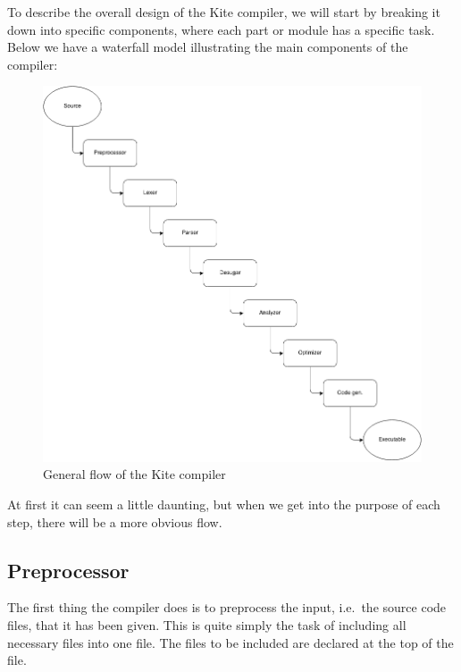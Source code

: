 
To describe the overall design of the Kite compiler, we will start by breaking it down into specific components, where each part or module has a specific task. Below we have a waterfall model illustrating the main components of the compiler:

\begin{figure}[H]
  \centering
  \includegraphics[scale=0.45]{images/flow.png}
  \caption{General flow of the Kite compiler}
\label{fig:flow}
\end{figure}

At first it can seem a little daunting, but when we get into the
purpose of each step, there will be a more obvious flow.


\subsection{Preprocessor}
The first thing the compiler does is to preprocess the input, i.e.\ the source code files, that it has been given. This is quite simply the task of including all necessary files into one file. The files to be included are declared at the top of the file.

